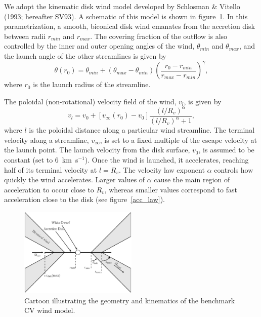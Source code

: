 \documentclass[preprint, a4paper, 11pt]{aastex}
\begin{document}
We adopt the kinematic disk wind model developed by Schlosman \&
Vitello (1993; hereafter SV93). A schematic of this model is shown in
figure~\ref{cartoon}. In this parametrization, a smooth, biconical
disk wind emanates from the accretion disk between radii $r_{min}$ and 
$r_{max}$. The covering fraction of the outflow is also controlled by the
inner and outer opening angles of the wind, $\theta_{min}$ and
$\theta_{max}$, and the launch angle of the other streamlines is given
by 
\begin{equation}
\theta(r_0) = \theta_{min} + (\theta_{max} - \theta_{min}) \left(\frac{r_0 - r_{min}}{r_{max} - r_{min}} \right)^{\gamma},
\label{theta}
\end{equation}
where $r_0$ is the launch radius of the streamline.

The poloidal (non-rotational) velocity field of the wind, $v_l$, is given by
\begin{equation}
v_l=v_0+\left[v_{\infty}(r_0)-v_0\right]\frac{\left(l/R_v\right)^{\alpha}}{\left(l/R_v\right)^{\alpha}+1},
\label{v_law}
\end{equation}
where $l$ is the poloidal distance along a particular wind
streamline. The terminal velocity along a streamline, $v_{\infty}$, is
set to a fixed multiple of the escape velocity at the launch
point. The launch velocity from the disk surface, $v_0$, is assumed to
be constant (set to $6$~km~s$^{-1}$). Once the wind is launched, it
accelerates, reaching half of its terminal velocity at $l = R_v$. The
velocity law exponent $\alpha$ controls how quickly the wind
accelerates. Larger values of $\alpha$ cause the main region of 
acceleration to occur close to $R_v$, whereas smaller values
correspond to fast acceleration close to the disk (see
figure~\ref{acc_law}). 


\begin{figure}
\centering
\includegraphics[width=0.5\textwidth]{figures/fig2_cartoon.eps}
\caption{Cartoon illustrating the geometry and kinematics of the benchmark CV wind model.}
\label{cartoon}
\end{figure}
\end{document}
